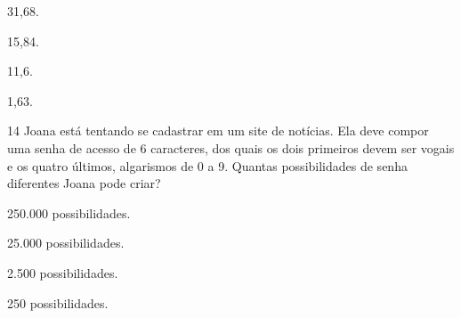 
\begin{multicols}{2}
\begin{escolha}
\item 31,68.
\item 15,84.
\item 11,6.
\item 1,63.
\end{escolha}
\end{multicols}









\num{14} Joana está tentando se cadastrar em um site de notícias. Ela deve
compor uma senha de acesso de 6 caracteres, dos quais os dois primeiros
devem ser vogais e os quatro últimos, algarismos de 0 a 9. Quantas
possibilidades de senha diferentes Joana pode criar?

\begin{escolha}
\item 250.000 possibilidades.
\item 25.000 possibilidades.
\item 2.500 possibilidades.
\item 250 possibilidades.
\end{escolha}

